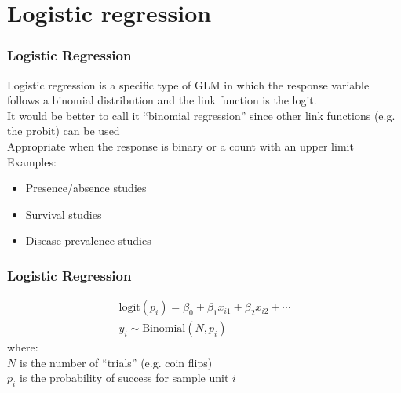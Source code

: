 \documentclass[color=usenames,dvipsnames]{beamer}\usepackage[]{graphicx}\usepackage[]{xcolor}
\begin{document}
\section{Logistic regression}


\begin{frame}
  \frametitle{Logistic Regression}
  Logistic regression is a specific type of GLM in which the
      response variable follows a binomial distribution and the link
      function is the logit. \\
  \pause
  \vfill
  It would be better to call it ``binomial regression'' since other
      link functions (e.g. the probit) can be used \\
  \pause
  \vfill
  Appropriate when the response is binary or a count with an
  upper limit
  \pause
  \vfill
  {Examples:}
      \begin{itemize}
        \normalsize
        \item Presence/absence studies
        \item Survival studies
        \item Disease prevalence studies
      \end{itemize}
\end{frame}







\begin{frame}
  \frametitle{Logistic Regression}
    \begin{gather*}
      \mathrm{logit}(p_i) = \beta_0 + \beta_1 x_{i1} + \beta_2 x_{i2} + \cdots \\
      y_i \sim \mathrm{Binomial}(N, p_i)
  \end{gather*}
  \pause
  {where: \\}
  $N$ is the number of ``trials'' (e.g. coin flips) \\
  $p_i$ is the probability of success for sample unit $i$
\end{frame}
\end{document}

